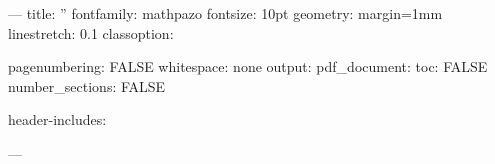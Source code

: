 ---
title: ''
fontfamily: mathpazo
fontsize: 10pt
geometry: margin=1mm
linestretch: 0.1
classoption:

pagenumbering: FALSE
whitespace: none
output:
  pdf_document:
    toc: FALSE
    number_sections: FALSE

header-includes:
\usepackage{multicol}
\usepackage{calc}
\usepackage{ifthen}
\usepackage[landscape]{geometry}
\usepackage{amsmath,amsthm,amsfonts,amssymb}
\usepackage{color,graphicx,overpic}
\usepackage{hyperref}
\usepackage{graphicx}
---

\ifthenelse{\lengthtest { \paperwidth = 11in}}
    { \geometry{top=.5in,left=.5in,right=.5in,bottom=.5in} }
    {\ifthenelse{ \lengthtest{ \paperwidth = 297mm}}
        {\geometry{top=1cm,left=1cm,right=1cm,bottom=1cm} }
        {\geometry{top=1cm,left=1cm,right=1cm,bottom=1cm} }
    }

\pagestyle{empty}

\makeatletter
\renewcommand{\section}{\@startsection{section}{1}{0mm}%
                                {-1ex plus -.5ex minus -.2ex}%
                                {0.5ex plus .2ex}%
                                {\normalfont\large\bfseries}}
\renewcommand{\subsection}{\@startsection{subsection}{2}{0mm}%
                                {-1explus -.5ex minus -.2ex}%
                                {0.5ex plus .2ex}%
                                {\normalfont\normalsize\bfseries}}
\renewcommand{\subsubsection}{\@startsection{subsubsection}{3}{0mm}%
                                {-1ex plus -.5ex minus -.2ex}%
                                {1ex plus .2ex}%
                                {\normalfont\small\bfseries}}
\makeatother

\def\BibTeX{{\rm B\kern-.05em{\sc i\kern-.025em b}\kern-.08em
    T\kern-.1667em\lower.7ex\hbox{E}\kern-.125emX}}

